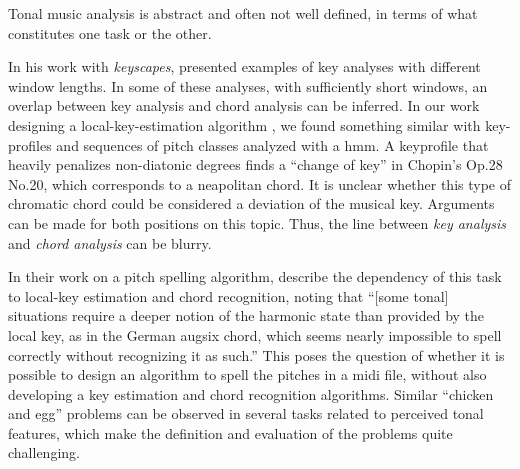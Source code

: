

Tonal music analysis is abstract and often not well defined,
in terms of what constitutes one task or the other.


In his work with \emph{keyscapes},
\textcite{sapp2011computational} presented examples of key
analyses with different window lengths. In some of these
analyses, with sufficiently short windows, an overlap
between key analysis and chord analysis can be inferred. In
our work designing a local-key-estimation algorithm
\parencite{napoleslopez2019keyfinding}, we found something
similar with key-profiles and sequences of pitch classes
analyzed with a \gls{hmm}. A \gls{keyprofile} that heavily
penalizes non-diatonic degrees finds a ``change of key'' in
Chopin's Op.28 No.20, which corresponds to a
\gls{neapolitan} chord. It is unclear whether this type of
chromatic chord could be considered a deviation of the
musical key. Arguments can be made for both positions on
this topic. Thus, the line between \emph{key analysis} and
\emph{chord analysis} can be blurry.


In their work on a pitch spelling algorithm,
\textcite{teodoru2007pitch} describe the dependency of this
task to local-key estimation and chord recognition, noting
that ``[some tonal] situations require a deeper notion of
the harmonic state than provided by the local key, as in the
German \gls{augsix} chord, which seems nearly impossible to
spell correctly without recognizing it as such.'' This poses
the question of whether it is possible to design an
algorithm to spell the pitches in a \gls{midi} file, without
also developing a key estimation and chord recognition
algorithms. Similar ``chicken and egg'' problems can be
observed in several tasks related to perceived tonal
features, which make the definition and evaluation of the
problems quite challenging.
